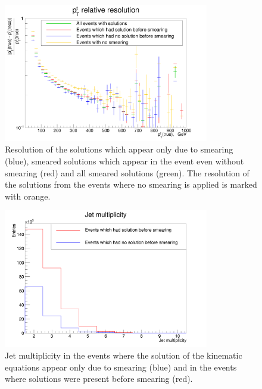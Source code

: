 \begin{figure}[t]
  \centering
  \includegraphics[width=0.8\textwidth]{10_appendices/smearing/ABS_toppt.png}
  \caption{Resolution of the solutions which appear only due to smearing (blue), smeared solutions which appear in the 
  event even without smearing (red) and all smeared solutions (green). The resolution of the solutions from the events
  where no smearing is applied is marked with orange.}
  \label{fig:RMSsmear}
\end{figure}

\begin{figure}[h]
  \centering
  \includegraphics[width=0.8\textwidth]{10_appendices/smearing/Jet_Mult.png}
  \caption{Jet multiplicity in the events where the solution of the kinematic equations appear only due to 
  smearing (blue) and in the events where solutions were present before smearing (red).}
  \label{fig:multSmear}
\end{figure}